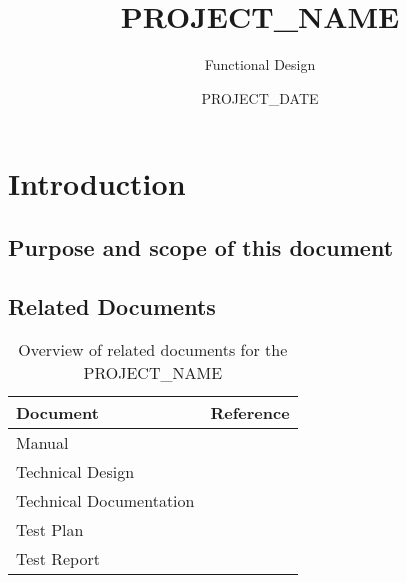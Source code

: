 \documentclass[signature]{deltares_report}
\begin{document}
\pagestyle{empty}
\cleardoublepage
%

\newcommand{\ProgramName}{PROJECT_NAME\xspace}

\title{\ProgramName}
\subtitle{Functional Design}
\classification{-}

\date{PROJECT_DATE}



\summary{}

\revieweri{}
\approvali{}

\disclaimer{}



\chapter{Introduction} 
\label{chapterIntroduction}

\section{Purpose and scope of this document} \label{sec:PurposeAndScope}

\section{Related Documents}
\label{sec:RelatedDocuments}
\bigskip
\begin{longtable}{|p{}|p{}|}
\caption{Overview of related documents for the \ProgramName \label{tab:RelatedDocuments}}\\	\hline
		\hline 
		\textbf{Document} & \textbf{Reference} \\
		\hline 
		\hline 
		Manual & \citep{PROJECT_NAME_ManualPROJECT_YEAR} \\
		Technical Design & \citep{PROJECT_NAME_TechnicalDesignPROJECT_YEAR} \\
		Technical Documentation & \citep{PROJECT_NAME_TechnicalDocumentationPROJECT_YEAR} \\
		Test Plan & \citep{PROJECT_NAME_TestPlanPROJECT_YEAR} \\
		Test Report & \citep{PROJECT_NAME_TestReportPROJECT_YEAR} \\
    \hline			
\end{longtable}
\end{document}
